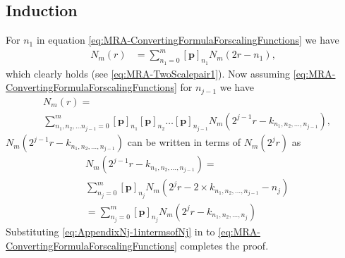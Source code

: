 \documentclass[11pt,draftcls,onecolumn,peerreview]{IEEEtran}
\newcommand{\cut}[1]{\textcolor{cyan}{#1}}
\begin{document}
\subsection{Induction}\label{ap:Induction}
For $n_1$ in equation \eqref{eq:MRA-ConvertingFormulaForscalingFunctions} we have
\begin{align}
 N_{m}\left(r\right)&=\sum_{n_1=0}^{m} \left[\mathbf p\right]_{n_1} N_{m}\left(2r-n_1\right) \label{eq:App-TwoScalepair1},
  \end{align}
which clearly holds (see \eqref{eq:MRA-TwoScalepair1}). Now assuming \eqref{eq:MRA-ConvertingFormulaForscalingFunctions} for $n_{j-1}$ we have
\begin{align}\label{eq:app-ConvertingFormulaForscalingFunctions}
 &N_m(r)=\nonumber \\
&\sum_{n_1,n_2, \dots n_{j-1}=0}^{m}\left[\mathbf p\right]_{n_1} \left[\mathbf p\right]_{n_2}\dots \left[\mathbf p\right]_{n_{j-1}}N_m(2^{j-1}r-k_{n_1,n_2, \dots, n_{j-1}}),
\end{align}
$N_m(2^{j-1}r-k_{n_1,n_2, \dots, n_{j-1}})$ can be written in terms of $N_m(2^{j}r)$ as
\begin{align}\label{eq:AppendixNj-1intermsofNj}
 &N_m(2^{j-1}r-k_{n_1,n_2, \dots, n_{j-1}})=\nonumber \\
&\sum_{n_j=0}^m \left[\mathbf p\right]_{n_j}N_m(2^jr-2\times k_{n_1,n_2, \dots, n_{j-1}}-n_j)\nonumber \\
&=\sum_{n_j=0}^m \left[\mathbf p\right]_{n_j}N_m(2^jr- k_{n_1,n_2, \dots, n_{j}})
\end{align}
Substituting \eqref{eq:AppendixNj-1intermsofNj} in to \eqref{eq:MRA-ConvertingFormulaForscalingFunctions} completes the proof.


\ifCLASSOPTIONcaptionsoff
  \newpage
\fi

%  
% 


 
\end{document}
